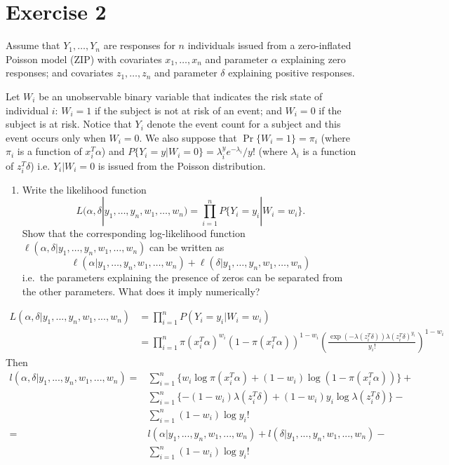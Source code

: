 \documentclass[a4paper,12pt]{article}\usepackage[]{graphicx}\usepackage[]{color}
\begin{document}
\section{Exercise 2}

Assume that $Y_1, \ldots, Y_n$ are responses for $n$ individuals issued from 
a
zero-inflated Poisson model (ZIP) with covariates $x_1, \ldots, x_n$ and
parameter $\alpha$ explaining zero responses; and covariates $z_1, \ldots,
z_n$ and parameter $\delta$ explaining positive responses.


Let $W_i$ be an unobservable binary variable that indicates the risk state of 
individual
$i$: $W_i=1$ if the subject is not at risk of an event; and $W_i=0$
if the subject is at risk. Notice that $Y_i$ denote the event count for a
subject and this event occurs only when $W_i=0$. We also suppose  that
$\Pr\{W_i=1\}=\pi_i$ (where $\pi_i$ is a function of $x_i^T\alpha$) and
$P\{Y_i=y|W_i=0\}=\lambda_i^y e^{-\lambda_i}/y!$ (where $\lambda_i$ is a
function of $z_i^T\delta$) i.e.  $Y_i|W_i=0$ is issued from the Poisson
distribution.


\begin{enumerate}
  \item[a)] Write the likelihood function $$L(\alpha, \delta |y_1, \ldots, y_n,
w_1, \ldots, w_n)=\prod_{i=1}^n P\{Y_i=y_i|W_i=w_i\}.$$ 
Show that the
corresponding log-likelihood function $\ell(\alpha, \delta |y_1, \ldots,
y_n, w_1, \ldots, w_n)$ can be written as $$\ell(\alpha |y_1, \ldots, y_n,
w_1, \ldots, w_n)+\ell(\delta |y_1, \ldots, y_n, w_1, \ldots, w_n)$$ i.e.\ the
parameters explaining the presence of zeros can be separated from the other
parameters. What does it imply numerically?\\
\end{enumerate}  
\color{blue}
\begin{align*}
    L(\alpha, \delta | y_1,...,y_n,w_1,...,w_n) &= \prod_{i=1}^n P(Y_i=y_i|W_i=w_i)\\
    &= \prod_{i=1}^n \pi(x_i^T\alpha)^{w_i} (1-\pi(x_i^T\alpha))^{1-w_i}\left(\frac{\exp(-\lambda (z_i^T\delta))\lambda(z_i^T\delta)^{y_i}}{y_i!}\right)^{1-w_i}
\end{align*}
Then
\begin{align*}
    l(\alpha, \delta | y_1,...,y_n,w_1,...,w_n)=&\sum_{i=1}^n \{w_i\log\pi(x_i^T\alpha) + (1-w_i)\log(1-\pi(x_i^T\alpha))\} + \\
    &\sum_{i=1}^n\{-(1-w_i)\lambda(z_i^T\delta)+(1-w_i)y_i\log\lambda(z_i^T\delta)\}-\\
    &\sum_{i=1}^n(1-w_i)\log y_i!\\
    =&l(\alpha | y_1,...,y_n,w_1,...,w_n) + l(\delta | y_1,...,y_n,w_1,...,w_n) - \\
    &\sum_{i=1}^n (1-w_i)\log y_i!
\end{align*}
\color{black}
\end{document}
